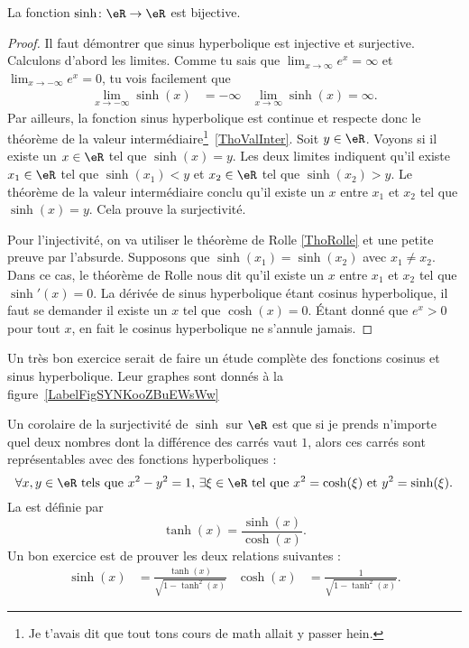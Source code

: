\begin{proposition}
	La fonction \( \sinh\colon \eR\to\eR \) est bijective.
\end{proposition}

\begin{proof}
	Il faut démontrer que sinus hyperbolique est injective et surjective. Calculons d'abord les limites. Comme tu sais que \( \lim_{x\to\infty} e^{x}=\infty\) et \( \lim_{x\to-\infty} e^{x}=0\), tu vois facilement que
	\begin{align}
		\lim_{x\to-\infty}\sinh(x) & =-\infty & \lim_{x\to\infty}\sinh(x)=\infty.
	\end{align}
	Par ailleurs, la fonction sinus hyperbolique est continue et respecte donc le théorème de la valeur intermédiaire\footnote{Je t'avais dit que tout tons cours de math allait y passer hein.}~\ref{ThoValInter}. Soit \( y\in\eR\). Voyons si il existe un \( x\in\eR\) tel que \( \sinh(x)=y\). Les deux limites indiquent qu'il existe \( x_1\in\eR\) tel que \( \sinh(x_1)<y\) et \( x_2\in\eR\) tel que \( \sinh(x_2)>y\). Le théorème de la valeur intermédiaire conclu qu'il existe un \( x\) entre \( x_1\) et \( x_2\) tel que \( \sinh(x)=y\). Cela prouve la surjectivité.

	Pour l'injectivité, on va utiliser le théorème de Rolle \ref{ThoRolle} et une petite preuve par l'absurde. Supposons que \( \sinh(x_1)=\sinh(x_2)\) avec \( x_1\neq x_2\). Dans ce cas, le théorème de Rolle nous dit qu'il existe un \( x\) entre \( x_1\) et \( x_2\) tel que \( \sinh'(x)=0\). La dérivée de sinus hyperbolique étant cosinus hyperbolique, il faut se demander il existe un \( x\) tel que \( \cosh(x)=0\). Étant donné que \(  e^{x}>0\) pour tout \( x\), en fait le cosinus hyperbolique ne s'annule jamais.
\end{proof}

\newcommand{\CaptionFigSYNKooZBuEWsWw}{En rouge, la fonction \( x\mapsto \sinh(x)\) et en bleu, la fonction \( x\mapsto\cosh(x)\).}


Un très bon exercice serait de faire un étude complète des fonctions cosinus et sinus hyperbolique. Leur graphes sont donnés à la figure~\ref{LabelFigSYNKooZBuEWsWw}

Un corolaire de la surjectivité de \( \sinh\) sur \( \eR\) est que si je prends n'importe quel deux nombres dont la différence des carrés vaut \( 1\), alors ces carrés sont représentables avec des fonctions hyperboliques :
\[
	\forall x,y\in\eR \text{ tels que } x^2-y^2=1,\,\exists\xi\in\eR \text{ tel que } x^2=\cosh(\xi)\text{ et }y^2=\sinh(\xi).
\]
La  est définie par
\begin{equation}
	\tanh(x)=\frac{ \sinh(x) }{ \cosh(x) }.
\end{equation}
Un bon exercice est de prouver les deux relations suivantes :
\begin{align}		\label{EqRelSinhthcosh}
	\sinh(x) & =\frac{ \tanh(x) }{ \sqrt{1-\tanh^2(x)} } & \cosh(x) & =\frac{1}{ \sqrt{1-\tanh^2(x)} }.
\end{align}

